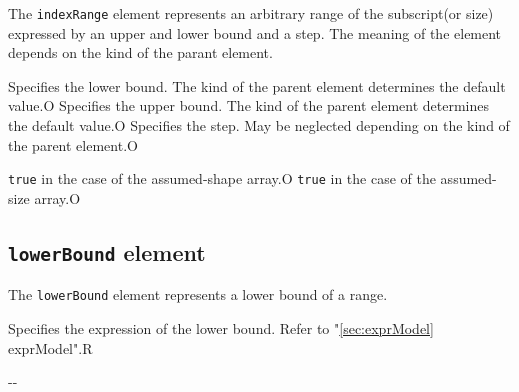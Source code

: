 The {\tt indexRange} element represents an arbitrary range of the subscript(or size) expressed by an upper and lower bound and a step.
The meaning of the element depends on the kind of the parant element.


\begin{XcodeMLChildElements}
{Specifies the lower bound. The kind of the parent element determines the default value.}{O}
{Specifies the upper bound. The kind of the parent element determines the default value.}{O}
{Specifies the step. May be neglected depending on the kind of the parent element.}{O}
\end{XcodeMLChildElements}

\begin{XcodeMLAttributes}
{{\tt true} in the case of the assumed-shape array.}{O}
{{\tt true} in the case of the assumed-size array.}{O}
\end{XcodeMLAttributes}


\subsection{ {\tt lowerBound} element}

The {\tt lowerBound} element represents a lower bound of a range.


\begin{XcodeMLChildElements}
{Specifies the expression of the lower bound. Refer to "\ref{sec:exprModel} exprModel".}{R}
\end{XcodeMLChildElements}

\begin{XcodeMLAttributes}
\XcodeMLAttrDef{-}{-}
{-}{-}
\end{XcodeMLAttributes}


